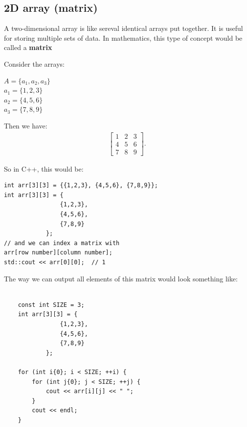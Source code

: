 \documentclass{report}
\begin{document}
    \pagebreak \bigbreak \noindent 
    \subsection{2D array (matrix)}
    \bigbreak \noindent 
    \begin{concept}
 A two-dimensional array is like sereval identical arrays put together. It is useful for storing multiple sets of data. In mathematics, this type of concept would be called a \textbf{matrix}
	\end{concept}
    \bigbreak \noindent 
    \begin{minipage}[]{0.47\textwidth}
    Consider the arrays:
    \begin{center}
        $A = \{a_{1}, a_{2}, a_{3}\} $ \\
        $a_{1} = \{1,2,3\} $ \\
        $a_{2} = \{4,5,6\} $ \\
        $a_{3} = \{7,8,9\} $ \\
    \end{center}
    \end{minipage}
    \begin{minipage}[]{0.47\textwidth}
    Then we have:
    \begin{align*}
        \begin{bmatrix}
            1 & 2 & 3 \\
            4 & 5 & 6 \\
            7 & 8 & 9
        \end{bmatrix}
    .\end{align*}
    \end{minipage}
    \bigbreak \noindent 
    So in C++, this would be:
    \bigbreak \noindent 
    \sepline
    \begin{verbatim}
int arr[3][3] = {{1,2,3}, {4,5,6}, {7,8,9}};
int arr[3][3] = {
                {1,2,3},
                {4,5,6},
                {7,8,9}
            };
// and we can index a matrix with
arr[row number][column number];
std::cout << arr[0][0];  // 1
    \end{verbatim}
    \sepline
    \bigbreak \noindent 
    The way we can output all elements of this matrix would look something like:
    \bigbreak \noindent 
    \begin{minipage}[t]{0.47\textwidth}
    \bigbreak \noindent 
    \sepline
    \begin{verbatim}

    const int SIZE = 3;
    int arr[3][3] = {
                {1,2,3},
                {4,5,6},
                {7,8,9}
            };

    for (int i{0}; i < SIZE; ++i) {
        for (int j{0}; j < SIZE; ++j) {
            cout << arr[i][j] << " ";
        } 
        cout << endl;
    }
    \end{verbatim}
    \sepline
    \end{minipage}
\end{document}
